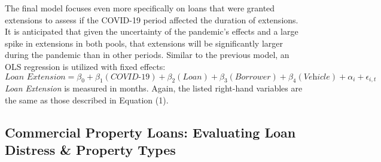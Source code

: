 \documentclass[10.5pt]{article}
\begin{document}
The final model focuses even more specifically on loans that were granted extensions to assess if the COVID-19 period affected the duration of extensions. It is anticipated that given the uncertainty of the pandemic's effects and a large spike in extensions in both pools, that extensions will be significantly larger during the pandemic than in other periods. Similar to the previous model, an OLS regression is utilized with fixed effects:  
\begin{equation}
    \textit{Loan Extension} = \beta_0 +
    \beta_1(\textit{COVID-19}) +
    \beta_2(\textit{Loan}) + \beta_3(\textit{Borrower}) + 
    \beta_4(\textit{Vehicle}) + \alpha_i + \epsilon_{i,t}
\end{equation}
\textit{Loan Extension} is measured in months. Again, the listed right-hand variables are the same as those described in Equation (1). 

\subsection{Commercial Property Loans: Evaluating Loan Distress \& Property Types}
\end{document}

